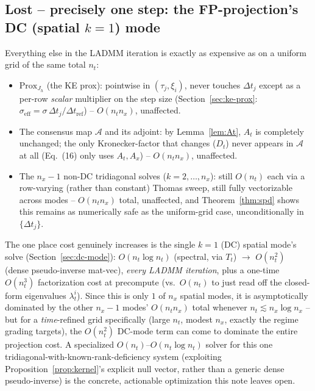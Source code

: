 \documentclass[11pt]{article}
\newcommand{\dt}{\Delta t}
\begin{document}
\subsection{Lost -- precisely one step: the FP-projection's DC (spatial $k{=}1$) mode}
Everything else in the LADMM iteration is exactly as expensive as on a uniform grid of the same
total $n_t$:
\begin{itemize}
  \item $\mathrm{Prox}_{J_h}$ (the KE prox): pointwise in $(\tau_j,\xi_i)$, never touches $\dt_j$
        except as a per-row \emph{scalar} multiplier on the step size
        (Section~\ref{sec:ke-prox}: $\sigma_\mathrm{eff}=\sigma\,\dt_j/\dt_\mathrm{ref}$) --
        $O(n_t n_x)$, unaffected.
  \item The consensus map $\mathcal{A}$ and its adjoint: by Lemma~\ref{lem:At}, $A_t$ is
        completely unchanged; the only Kronecker-factor that changes ($D_t$) never appears in
        $\mathcal{A}$ at all (Eq.~(16) only uses $A_t,A_x$) -- $O(n_t n_x)$, unaffected.
  \item The $n_x{-}1$ non-DC tridiagonal solves ($k=2,\dots,n_x$): still $O(n_t)$ each via a
        row-varying (rather than constant) Thomas sweep, still fully vectorizable across modes
        -- $O(n_t n_x)$ total, unaffected, and Theorem~\ref{thm:spd} shows this remains as
        numerically safe as the uniform-grid case, unconditionally in $\{\dt_j\}$.
\end{itemize}
The one place cost genuinely increases is the single $k{=}1$ (DC) spatial mode's solve
(Section~\ref{sec:dc-mode}): $O(n_t\log n_t)$ (spectral, via $T_t$) $\to$ $O(n_t^2)$ (dense
pseudo-inverse mat-vec), \emph{every LADMM iteration}, plus a one-time $O(n_t^3)$ factorization
cost at precompute (vs.\ $O(n_t)$ to just read off the closed-form eigenvalues $\lambda_t^i$).
Since this is only $1$ of $n_x$ spatial modes, it is asymptotically dominated by the other
$n_x{-}1$ modes' $O(n_t n_x)$ total whenever $n_t \lesssim n_x\log n_x$ -- but for a
\emph{time}-refined grid specifically (large $n_t$, modest $n_x$, exactly the regime grading
targets), the $O(n_t^2)$ DC-mode term can come to dominate the entire projection cost. A
specialized $O(n_t)$--$O(n_t\log n_t)$ solver for this one tridiagonal-with-known-rank-deficiency
system (exploiting Proposition~\ref{prop:kernel}'s explicit null vector, rather than a generic
dense pseudo-inverse) is the concrete, actionable optimization this note leaves open.
\end{document}
